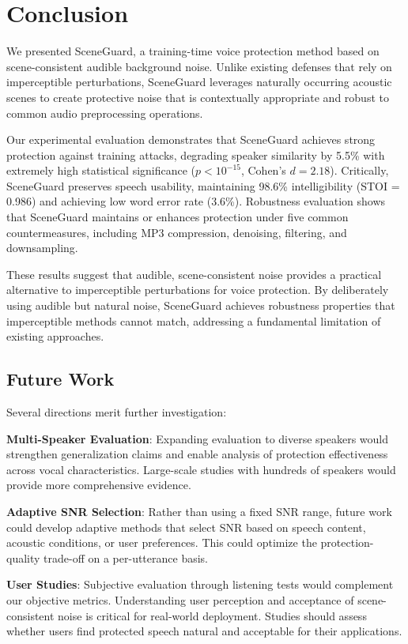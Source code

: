\section{Conclusion}

We presented SceneGuard, a training-time voice protection method based on scene-consistent audible background noise. Unlike existing defenses that rely on imperceptible perturbations, SceneGuard leverages naturally occurring acoustic scenes to create protective noise that is contextually appropriate and robust to common audio preprocessing operations.

Our experimental evaluation demonstrates that SceneGuard achieves strong protection against training attacks, degrading speaker similarity by 5.5\% with extremely high statistical significance ($p < 10^{-15}$, Cohen's $d = 2.18$). Critically, SceneGuard preserves speech usability, maintaining 98.6\% intelligibility (STOI = 0.986) and achieving low word error rate (3.6\%). Robustness evaluation shows that SceneGuard maintains or enhances protection under five common countermeasures, including MP3 compression, denoising, filtering, and downsampling.

These results suggest that audible, scene-consistent noise provides a practical alternative to imperceptible perturbations for voice protection. By deliberately using audible but natural noise, SceneGuard achieves robustness properties that imperceptible methods cannot match, addressing a fundamental limitation of existing approaches.

\subsection{Future Work}

Several directions merit further investigation:

\textbf{Multi-Speaker Evaluation}: Expanding evaluation to diverse speakers would strengthen generalization claims and enable analysis of protection effectiveness across vocal characteristics. Large-scale studies with hundreds of speakers would provide more comprehensive evidence.

\textbf{Adaptive SNR Selection}: Rather than using a fixed SNR range, future work could develop adaptive methods that select SNR based on speech content, acoustic conditions, or user preferences. This could optimize the protection-quality trade-off on a per-utterance basis.

\textbf{User Studies}: Subjective evaluation through listening tests would complement our objective metrics. Understanding user perception and acceptance of scene-consistent noise is critical for real-world deployment. Studies should assess whether users find protected speech natural and acceptable for their applications.

